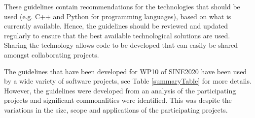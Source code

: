 \documentclass[jnr]{iosart2x}
\begin{document}
These guidelines contain recommendations for the technologies that should be used (e.g. C++ and Python for programming languages), based on what is currently available.
Hence, the guidelines should be reviewed and updated regularly to ensure that the best available technological solutions are used.
Sharing the technology allows code to be developed that can easily be shared amongst collaborating projects.

The guidelines that have been developed for WP10 of SINE2020 have been used by a wide variety of software projects, see Table \ref{summaryTable} for more details.
However, the guidelines were developed from an analysis of the participating projects and significant commonalities were identified.
This was despite the variations in the size, scope and applications of the participating projects. 
\end{document}
